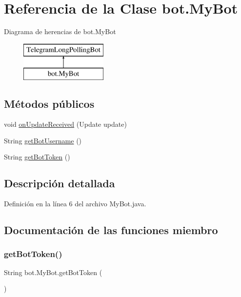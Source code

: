 \hypertarget{classbot_1_1_my_bot}{}\section{Referencia de la Clase bot.\+My\+Bot}
\label{classbot_1_1_my_bot}
Diagrama de herencias de bot.\+My\+Bot\begin{figure}[H]
\begin{center}
\leavevmode
\includegraphics[height=2.000000cm]{classbot_1_1_my_bot}
\end{center}
\end{figure}
\subsection*{Métodos públicos}
\begin{DoxyCompactItemize}
\item 
void \mbox{\hyperlink{classbot_1_1_my_bot_a222fe9120fe705ceab16e5dbafaebefd}{on\+Update\+Received}} (Update update)
\item 
String \mbox{\hyperlink{classbot_1_1_my_bot_ada827aa5283dc9d85d411114b563c16c}{get\+Bot\+Username}} ()
\item 
String \mbox{\hyperlink{classbot_1_1_my_bot_a0cf67098edb3a9a5cf11ff00791db8df}{get\+Bot\+Token}} ()
\end{DoxyCompactItemize}


\subsection{Descripción detallada}


Definición en la línea 6 del archivo My\+Bot.\+java.



\subsection{Documentación de las funciones miembro}
\mbox{\label{classbot_1_1_my_bot_a0cf67098edb3a9a5cf11ff00791db8df}} 
\subsubsection{\texorpdfstring{getBotToken()}{getBotToken()}}
{\footnotesize\ttfamily String bot.\+My\+Bot.\+get\+Bot\+Token (\begin{DoxyParamCaption}{ }\end{DoxyParamCaption})}



